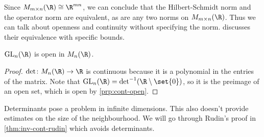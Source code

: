 Since $M_{m \times n}(\R) \cong \R^{mn}$, we can conclude that
the Hilbert-Schmidt norm and the operator norm are equivalent,
as are any two norms on $M_{m \times n}(\R)$.
Thus we can talk about openness and continuity without specifying
the norm.
 discusses
their equivalence with specific bounds.

\begin{proposition*}
    $\GL_n(\R)$ is open in $M_n(\R)$.
\end{proposition*}
\begin{proof}
    $\det \colon M_n(\R) \to \R$ is continuous because
    it is a polynomial in the entries of the matrix.
    Note that $\GL_n(\R) = \det^{-1}(\R \setminus \set{0})$,
    so it is the preimage of an open set, which is open
    by \cref{prp:cont-open}.
\end{proof}
Determinants pose a problem in infinite dimensions.
This also doesn't provide estimates on the size of the neighbourhood.
We will go through Rudin's proof in \cref{thm:inv-cont-rudin}
which avoids determinants.

